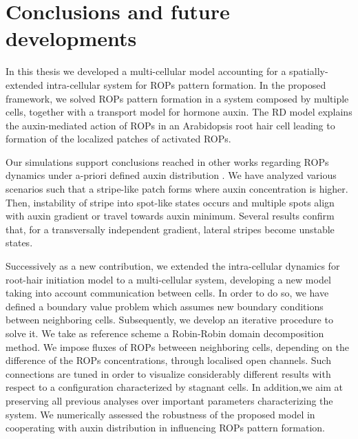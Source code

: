 \chapter{Conclusions and future developments}%
\label{ch:conclusions}
In this thesis we developed a multi-cellular model accounting for a spatially-extended intra-cellular system for ROPs pattern formation. In the proposed framework, we solved ROPs pattern formation in a system composed by multiple cells, together with a transport model for hormone auxin. The RD model explains the auxin-mediated action of ROPs in an Arabidopsis root hair cell leading to formation of the localized patches of activated ROPs.

Our simulations support conclusions reached in other works regarding ROPs dynamics under a-priori defined auxin distribution \cite{phdthesis:victor, intra1_R, intra2}. We have analyzed various scenarios such that a stripe-like patch forms where auxin concentration is higher. Then, instability of stripe into spot-like states occurs and multiple spots align with auxin gradient or travel towards auxin minimum. Several results confirm that, for a transversally independent gradient, lateral stripes become unstable states.

Successively as a new contribution, we extended the intra-cellular dynamics for root-hair initiation model to a multi-cellular system, developing a new model taking into account communication between cells. In order to do so, we have defined a boundary value problem which assumes new boundary conditions between neighboring cells. Subsequently, we develop an iterative procedure to solve it. We take as reference scheme a Robin-Robin domain decomposition method. We impose fluxes of ROPs betweeen neighboring cells, depending on the difference of the ROPs concentrations, through localised open channels. Such connections are tuned in order to visualize considerably different results with respect to a configuration characterized by stagnant cells. In addition,we aim at preserving all previous analyses over important parameters characterizing the system. We numerically assessed the robustness of the proposed model in cooperating with auxin distribution in influencing ROPs pattern formation.

